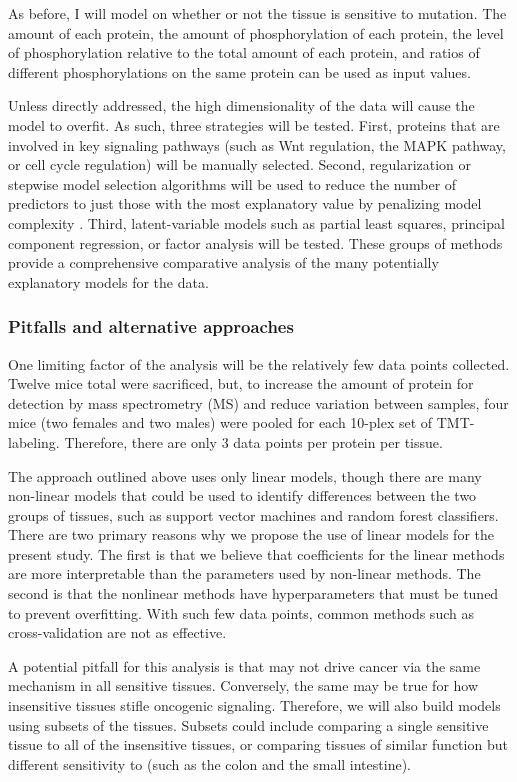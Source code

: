 As before, I will model on whether or not the tissue is sensitive to \KRAS{} mutation. 
The amount of each protein, the amount of phosphorylation of each protein, the level of phosphorylation relative to the total amount of each protein, and ratios of different phosphorylations on the same protein can be used as input values.

Unless directly addressed, the high dimensionality of the data will cause the model to overfit.
As such, three strategies will be tested.
First, proteins that are involved in key signaling pathways (such as Wnt regulation, the MAPK pathway, or cell cycle regulation) will be manually selected.
Second, regularization or stepwise model selection algorithms will be used to reduce the number of predictors to just those with the most explanatory value by penalizing model complexity \cite{Tibshirani1996RegressionLasso., Zou2005RegularizationNet}.
Third, latent-variable models such as partial least squares, principal component regression, or factor analysis will be tested.
These groups of methods provide a comprehensive comparative analysis of the many potentially explanatory models for the data.

\subsubsection*{Pitfalls and alternative approaches}

One limiting factor of the analysis will be the relatively few data points collected.
Twelve mice total were sacrificed, but, to increase the amount of protein for detection by mass spectrometry (MS) and reduce variation between samples, four mice (two females and two males) were pooled for each 10-plex set of TMT-labeling.
Therefore, there are only 3 data points per protein per tissue.

The approach outlined above uses only linear models, though there are many non-linear models that could be used to identify differences between the two groups of tissues, such as support vector machines and random forest classifiers.
There are two primary reasons why we propose the use of linear models for the present study.
The first is that we believe that coefficients for the linear methods are more interpretable than the parameters used by non-linear methods.
The second is that the nonlinear methods have hyperparameters that must be tuned to prevent overfitting.
With such few data points, common methods such as cross-validation are not as effective.

A potential pitfall for this analysis is that \KRAS{} may not drive cancer via the same mechanism in all \KRAS{} sensitive tissues.
Conversely, the same may be true for how insensitive tissues stifle oncogenic \kras{} signaling.
Therefore, we will also build models using subsets of the tissues.
Subsets could include comparing a single sensitive tissue to all of the insensitive tissues, or comparing tissues of similar function but different sensitivity to \KRAS{} (such as the colon and the small intestine).

